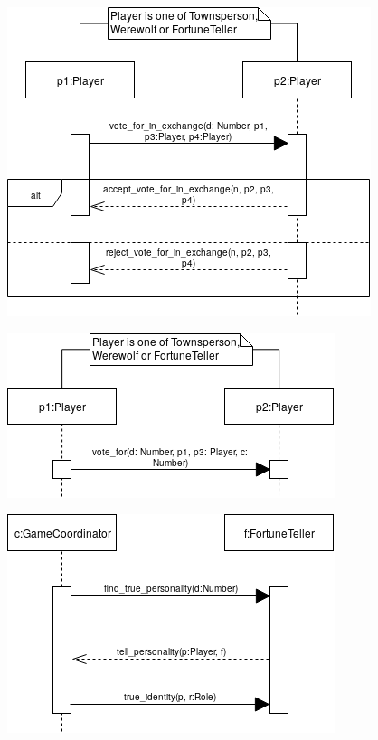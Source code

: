 \documentclass{article}
\begin{document}
\begin{center}
\includegraphics[scale=0.6]{./images/sequence_diagram_promise_of_future_reward.png}
\end{center}

\begin{center}
\includegraphics[scale=0.6]{./images/sequence_diagram_appeal_to_authority.png}
\end{center}

\begin{center}
\includegraphics[scale=0.6]{./images/sequence_diagram_fortune_teller.png}
\end{center}
\end{document}
